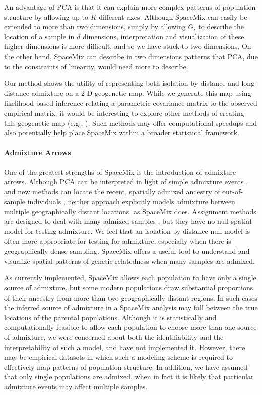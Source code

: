 \documentclass[10pt,letterpaper]{article}
\begin{document}
An advantage of PCA is that it can explain more complex patterns of population structure by allowing up to $K$ different axes.
Although SpaceMix can easily be extended to more than two dimensions, 
simply by allowing $G_i$ to describe the location of a sample in $d$ dimensions, 
interpretation and visualization of these higher dimensions is more difficult,
and so we have stuck to two dimensions.
On the other hand, SpaceMix can describe in two dimensions patterns that PCA,
due to the constraints of linearity, would need more to describe.

Our method shows the utility of representing both isolation by distance and 
long-distance admixture on a 2-D geogenetic map.  
While we generate this map using likelihood-based inference 
relating a parametric covariance matrix to the observed empirical matrix, 
it would be interesting to explore other methods of creating this geogenetic map 
(e.g., \cite{Bookstein_1989,Sampson_Guttorp_1992,yang_model-based_2012,Petkova_2014_EEMS}).  
Such methods may offer computational speedups 
and also potentially help place SpaceMix within a broader statistical framework.

\paragraph{Admixture Arrows}
One of the greatest strengths of SpaceMix is the introduction of admixture arrows. 
Although PCA can be interpreted in light of simple admixture events \cite{mcvean_genealogical_2009}, 
and new methods can locate the recent, spatially admixed ancestry of out-of-sample individuals \cite{yang_model-based_2012,yang_spatial_2014},
neither approach explicitly models admixture between multiple geographically distant locations,
as SpaceMix does.
Assignment methods are designed to deal with many admixed samples \cite{STRUCTURE}, 
but they have no null spatial model for testing admixture.
We feel that an isolation by distance null model is often more appropriate for testing for admixture, 
especially when there is geographically dense sampling. 
SpaceMix offers a useful tool to understand and visualize spatial patterns of genetic relatedness when many samples are admixed. 

As currently implemented, SpaceMix allows each population to have only a single source of admixture, 
but some modern populations draw substantial proportions of their ancestry from more than two geographically distant regions.
In such cases the inferred source of admixture in a SpaceMix analysis may fall between the true locations of the parental populations.  
Although it is statistically and computationally feasible to allow each population to choose more than one source of admixture, 
we were concerned about both the identifiability and the interpretability of such a model, and have not implemented it.
However, there may be empirical datasets in which such a modeling scheme is required to effectively map patterns of population structure.
In addition, we have assumed that only single populations are admixed, when in fact it is likely that particular admixture events may affect multiple samples.
\end{document}
